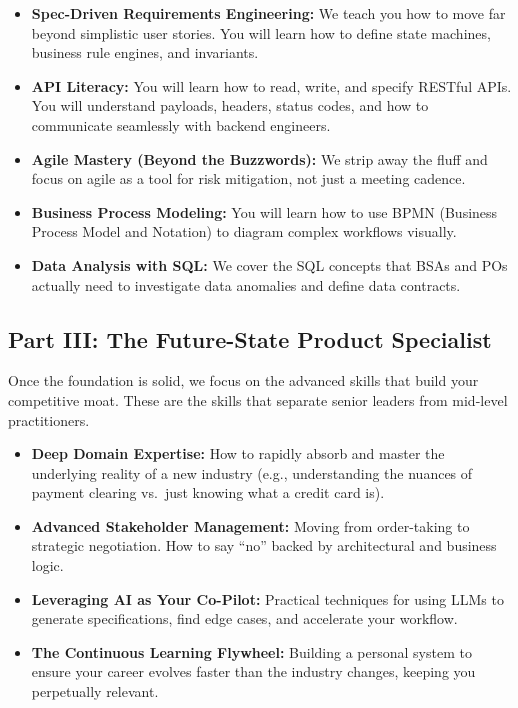 \documentclass[
  11pt,
  openany,
  oneside]{book}
\providecommand{\tightlist}{%
  \setlength{\itemsep}{0pt}\setlength{\parskip}{0pt}}
\begin{document}
\begin{itemize}
\tightlist
\item
  \textbf{Spec-Driven Requirements Engineering:} We teach you how to
  move far beyond simplistic user stories. You will learn how to define
  state machines, business rule engines, and invariants.
\item
  \textbf{API Literacy:} You will learn how to read, write, and specify
  RESTful APIs. You will understand payloads, headers, status codes, and
  how to communicate seamlessly with backend engineers.
\item
  \textbf{Agile Mastery (Beyond the Buzzwords):} We strip away the fluff
  and focus on agile as a tool for risk mitigation, not just a meeting
  cadence.
\item
  \textbf{Business Process Modeling:} You will learn how to use BPMN
  (Business Process Model and Notation) to diagram complex workflows
  visually.
\item
  \textbf{Data Analysis with SQL:} We cover the SQL concepts that BSAs
  and POs actually need to investigate data anomalies and define data
  contracts.
\end{itemize}

\subsection{Part III: The Future-State Product
Specialist}\label{part-iii-the-future-state-product-specialist}

Once the foundation is solid, we focus on the advanced skills that build
your competitive moat. These are the skills that separate senior leaders
from mid-level practitioners.

\begin{itemize}
\tightlist
\item
  \textbf{Deep Domain Expertise:} How to rapidly absorb and master the
  underlying reality of a new industry (e.g., understanding the nuances
  of payment clearing vs.~just knowing what a credit card is).
\item
  \textbf{Advanced Stakeholder Management:} Moving from order-taking to
  strategic negotiation. How to say ``no'' backed by architectural and
  business logic.
\item
  \textbf{Leveraging AI as Your Co-Pilot:} Practical techniques for
  using LLMs to generate specifications, find edge cases, and accelerate
  your workflow.
\item
  \textbf{The Continuous Learning Flywheel:} Building a personal system
  to ensure your career evolves faster than the industry changes,
  keeping you perpetually relevant.
\end{itemize}
\end{document}
